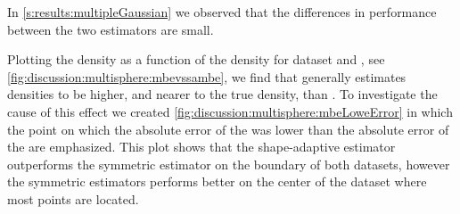 
	In \cref{s:results:multipleGaussian} we observed that the differences in performance between the two estimators are small. 

	Plotting the \mbe density as a function of the \sambe density for dataset \ferdosiTwo and \baakmanTwo, see \cref{fig:discussion:multisphere:mbevssambe}, we find that \sambe generally estimates densities to be higher, and nearer to the true density, than \mbe. To investigate the cause of this effect we created \cref{fig:discussion:multisphere:mbeLoweError} in which the point on which the absolute error of the \mbe was lower than the absolute error of the \sambe are emphasized. This plot shows that the shape-adaptive estimator outperforms the symmetric estimator on the boundary of both datasets, however the symmetric estimators performs better on the center of the dataset where most points are located. 

